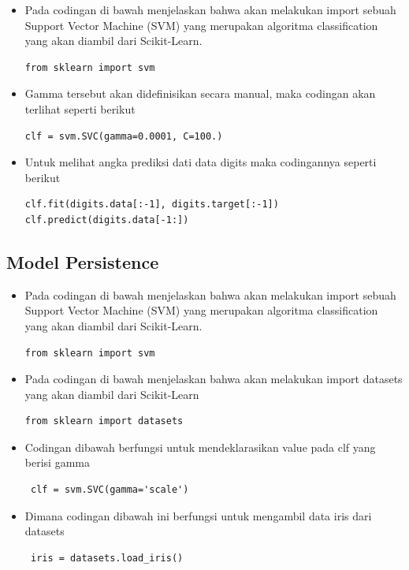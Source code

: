 \begin{enumerate}
\begin{itemize}
\item Pada codingan di bawah menjelaskan bahwa akan melakukan import sebuah Support Vector Machine (SVM) yang merupakan algoritma classification yang akan diambil dari Scikit-Learn.
\begin{verbatim}
from sklearn import svm
\end{verbatim}

\item Gamma tersebut akan didefinisikan secara manual, maka codingan akan terlihat seperti berikut
\begin{verbatim}
clf = svm.SVC(gamma=0.0001, C=100.)
\end{verbatim}

\item Untuk melihat angka prediksi dati data digits maka codingannya seperti berikut
\begin{verbatim}
clf.fit(digits.data[:-1], digits.target[:-1])
clf.predict(digits.data[-1:])
\end{verbatim}

\end{itemize}

\subsection{ Model Persistence}
\begin{itemize}

\item  Pada codingan di bawah menjelaskan bahwa akan melakukan import sebuah Support Vector Machine (SVM) yang merupakan algoritma classification yang akan diambil dari Scikit-Learn.
\begin{verbatim}
from sklearn import svm
\end{verbatim}

\item Pada codingan di bawah menjelaskan bahwa akan melakukan import datasets yang akan diambil dari Scikit-Learn
\begin{verbatim}
from sklearn import datasets
\end{verbatim}

\item Codingan dibawah berfungsi untuk mendeklarasikan value pada clf yang berisi gamma
\begin{verbatim}
 clf = svm.SVC(gamma='scale')
\end{verbatim}

\item Dimana codingan dibawah ini berfungsi untuk mengambil data iris dari datasets
\begin{verbatim}
 iris = datasets.load_iris()
\end{verbatim}


\end{itemize}
\end{enumerate}
